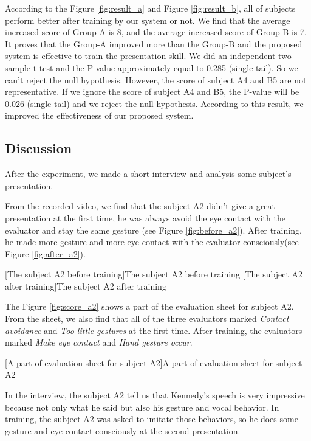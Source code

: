 \par According to the Figure \ref{fig:result_a} and Figure \ref{fig:result_b}, all of subjects perform better after training by our system or not. We find that the average increased score of Group-A is 8, and the average increased score of Group-B is 7. It proves that the Group-A improved more than the Group-B and the proposed system is effective to train the presentation skill. We did an independent two-sample t-test and the P-value approximately equal to 0.285 (single tail). So we can't reject the null hypothesis. However, the score of subject A4 and B5 are not representative. If we ignore the score of subject A4 and B5, the P-value will be 0.026 (single tail) and we reject the null hypothesis. According to this result, we improved the effectiveness of our proposed system.


\subsection*{Discussion}
\label{sub:dis}

\par After the experiment, we made a short interview and analysis some subject's presentation.

\par From the recorded video, we find that the subject A2 didn't give a great presentation at the first time, he was always avoid the eye contact with the evaluator and stay the same gesture (see Figure \ref{fig:before_a2}). After training, he made more gesture and more eye contact with the evaluator consciously(see Figure \ref{fig:after_a2}).

[The subject A2 before training]{The subject A2 before training}
[The subject A2 after training]{The subject A2 after training}

\par The Figure \ref{fig:score_a2} shows a part of the evaluation sheet for subject A2. From the sheet, we also find that all of the three evaluators marked \emph{Contact avoidance} and \emph{Too little gestures} at the first time. After training, the evaluators marked \emph{Make eye contact} and \emph{Hand gesture occur}.

[A part of evaluation sheet for subject A2]{A part of evaluation sheet for subject A2}

\par In the interview, the subject A2 tell us that Kennedy's speech is very impressive because not only what he said but also his gesture and vocal behavior. In training, the subject A2 was asked to imitate those behaviors, so he does some gesture and eye contact consciously at the second presentation. 

